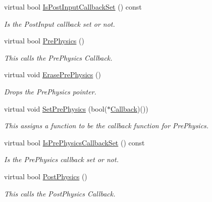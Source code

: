 \begin{DoxyCompactItemize}
virtual bool \hyperlink{classphys_1_1CallBackManager_afa96dbc0779e5fa386546502b3db6c39}{IsPostInputCallbackSet} () const 
\begin{DoxyCompactList}\small\item\em Is the PostInput callback set or not. \item\end{DoxyCompactList}\item 
virtual bool \hyperlink{classphys_1_1CallBackManager_a65867cc4855f0f8cd84a2b4a8bbf0fd6}{PrePhysics} ()
\begin{DoxyCompactList}\small\item\em This calls the PrePhysics Callback. \item\end{DoxyCompactList}\item 
virtual void \hyperlink{classphys_1_1CallBackManager_afaeba4d6ae245d1560b76799417cce40}{ErasePrePhysics} ()
\begin{DoxyCompactList}\small\item\em Drops the PrePhysics pointer. \item\end{DoxyCompactList}\item 
virtual void \hyperlink{classphys_1_1CallBackManager_a3f06ccacd416b3109f20c30cd30f9efe}{SetPrePhysics} (bool($\ast$\hyperlink{classphys_1_1ManagerBase_a753f5f0127131529767beab2502f480b}{Callback})())
\begin{DoxyCompactList}\small\item\em This assigns a function to be the callback function for PrePhysics. \item\end{DoxyCompactList}\item 
virtual bool \hyperlink{classphys_1_1CallBackManager_a8684425c42a4416a204852ce6a246dc6}{IsPrePhysicsCallbackSet} () const 
\begin{DoxyCompactList}\small\item\em Is the PrePhysics callback set or not. \item\end{DoxyCompactList}\item 
virtual bool \hyperlink{classphys_1_1CallBackManager_a06bf0e8787f21caf31bf428727155084}{PostPhysics} ()
\begin{DoxyCompactList}\small\item\em This calls the PostPhysics Callback. \item\end{DoxyCompactList}\item 

\end{DoxyCompactItemize}
